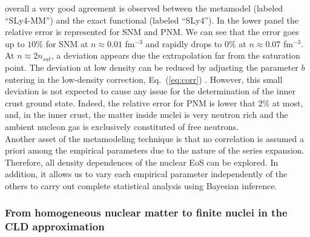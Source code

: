 overall a very good agreement is observed between the metamodel (labeled
``SLy4-MM'') and the exact functional (labeled ``SLy4''). In the lower panel 
the relative error is represented for
SNM and PNM. We can see that the error goes up to $10\%$ for SNM at $n \approx
0.01$ fm$^{-3}$ and rapidly drops to $0\%$ at $n \approx 0.07$
fm$^{-3}$. At $n \approx 2n_{sat}$, a deviation appears due the extrapolation far
from the saturation point. The deviation at low density can be reduced by 
adjusting the parameter $b$ entering in the low-density correction,
Eq.~(\ref{eq:corr}) \cite{Antic2019}. However,
this small deviation is not expected to cause any issue for the determination
of the inner crust ground state. Indeed, the relative error for PNM is lower 
that $2\%$ at most, and, in the inner crust, the matter inside nuclei is very 
neutron rich and the ambient nucleon gas is exclusively constituted of free
neutrons. \\
Another asset of the metamodeling technique is that no correlation is assumed
a priori among the empirical parameters due to the nature of the
series expansion. Therefore, all density dependences of the
nuclear EoS can be explored. In addition, it allows us to vary each empirical 
parameter independently of the others to carry out complete statistical 
analysis using Bayesian inference. 

\subsubsection{From homogeneous nuclear matter to finite nuclei in the CLD 
approximation}\label{subsubsec:cld}


